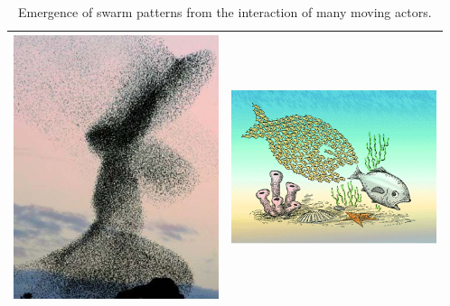 \documentclass[11pt,oneside,a4paper,openright]{report}
\begin{document}


	\begin{table}[h]
	\centering
	\begin{tabular}{|c|c|}
		\hline
		\includegraphics[width=60mm,keepaspectratio=true]{figures/swarm2.jpg}
		&
		\includegraphics[width=60mm,keepaspectratio=true]{figures/emergence_1.png}\\
		\hline
	\end{tabular}
	\caption{Emergence of swarm patterns from the interaction of many moving actors.}
	\label{tab:tableSwarm}
	\end{table}
\end{document}
